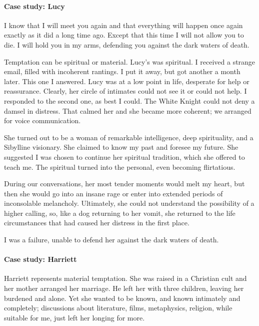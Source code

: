 \paragraph{Case study: Lucy}
\begin{quotex}
I know that I will meet you again and that everything will happen once again exactly as it did a long time ago. Except that this time I will not allow you to die. I will hold you in my arms, defending you against the dark waters of death. 

\end{quotex}
Temptation can be spiritual or material. Lucy's was spiritual. I received a strange email, filled with incoherent rantings. I put it away, but got another a month later. This one I answered. Lucy was at a low point in life, desperate for help or reassurance. Clearly, her circle of intimates could not see it or could not help. I responded to the second one, as best I could. The White Knight could not deny a damsel in distress. That calmed her and she became more coherent; we arranged for voice communication.

She turned out to be a woman of remarkable intelligence, deep spirituality, and a Sibylline visionary. She claimed to know my past and foresee my future. She suggested I was chosen to continue her spiritual tradition, which she offered to teach me. The spiritual turned into the personal, even becoming flirtatious. 

During our conversations, her most tender moments would melt my heart, but then she would go into an insane rage or enter into extended periods of inconsolable melancholy. Ultimately, she could not understand the possibility of a higher calling, so, like a dog returning to her vomit, she returned to the life circumstances that had caused her distress in the first place.

I was a failure, unable to defend her against the dark waters of death.

\paragraph{Case study: Harriett}
Harriett represents material temptation. She was raised in a Christian cult and her mother arranged her marriage. He left her with three children, leaving her burdened and alone. Yet she wanted to be known, and known intimately and completely; discussions about literature, films, metaphysics, religion, while suitable for me, just left her longing for more.

